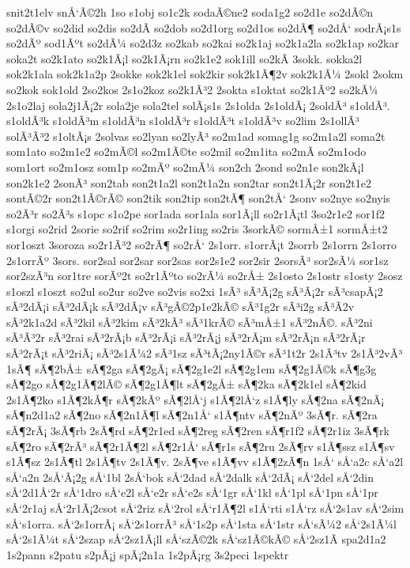 {snit2t1elv
snÅ‘Ã©2h
1so
s1obj
so1c2k
sodaÃ©ne2
soda1g2
so2d1e
so2dÃ©n
so2dÃ©v
so2did
so2dis
so2dÃ­
so2dob
so2d1org
so2d1os
so2dÃ¶
so2dÅ‘
sodrÃ¡s1s
so2dÃº
sod1Ãºt
so2dÃ¼
so2d3z
so2kab
so2kai
so2k1aj
so2k1a2la
so2k1ap
so2kar
soka2t
so2k1ato
so2k1Ã¡l
so2k1Ã¡rn
so2k1e2
sok1ill
so2kÃ­
3sokk.
sokka2l
sok2k1ala
sok2k1a2p
2sokke
sok2k1el
sok2kir
sok2k1Ã¶2v
sok2k1Ã¼
2sokl
2sokm
so2kok
sok1old
2so2kos
2s1o2koz
so2k1Ã³2
2sokta
s1oktat
so2k1Ãº2
so2kÃ¼
2s1o2laj
sola2j1Ã¡2r
sola2je
sola2tel
solÃ¡s1s
2s1olda
2s1oldÃ¡
2soldÃ³
s1oldÃ³.
s1oldÃ³k
s1oldÃ³m
s1oldÃ³n
s1oldÃ³r
s1oldÃ³t
s1oldÃ³v
so2lim
2s1ollÃ³
solÃ³Ã³2
s1oltÃ¡s
2solvas
so2lyan
so2lyÃ³
so2m1ad
somag1g
so2m1a2l
soma2t
som1ato
so2m1e2
so2mÃ©l
so2m1Ã©te
so2mil
so2m1ita
so2mÃ­
so2m1odo
som1ort
so2m1osz
som1p
so2mÃº
so2mÃ¼
son2ch
2sond
so2n1e
son2kÃ¡l
son2k1e2
2sonÃ³
son2tab
son2t1a2l
son2t1a2n
son2tar
son2t1Ã¡2r
son2t1e2
sontÃ©2r
son2t1Ã©rÃ©
son2tik
son2tip
son2tÃ¶
son2tÅ‘
2sonv
so2nye
so2nyis
so2Ã³r
so2Ã³s
s1opc
s1o2pe
sor1ada
sor1ala
sor1Ã¡ll
so2r1Ã¡tl
3so2r1e2
sor1f2
s1orgi
so2rid
2sorie
so2rif
so2rim
so2r1ing
so2ris
3sorkÃ©
sormÅ±1
sormÅ±t2
sor1oszt
3soroza
so2r1Ã³2
so2rÃ¶
so2rÅ‘
2s1orr.
s1orrÃ¡t
2sorrb
2s1orrn
2s1orro
2s1orrÃº
3sors.
sor2sal
sor2sar
sor2sas
sor2s1e2
sor2sir
2sorsÃ³
sor2sÃ¼
sor1sz
sor2szÃ³n
sor1tre
sorÃº2t
so2r1Ãºto
so2rÃ¼
so2rÅ±
2s1osto
2s1ostr
s1osty
2sosz
s1oszl
s1oszt
so2ul
so2ur
so2ve
so2vis
so2xi
1sÃ³
sÃ³Ã¡2g
sÃ³Ã¡2r
sÃ³csapÃ¡2
sÃ³2dÃ¡i
sÃ³2dÃ¡k
sÃ³2dÃ¡v
sÃ³gÃ©2p1e2kÃ©
sÃ³1g2r
sÃ³i2g
sÃ³Ã­2v
sÃ³2k1a2d
sÃ³2kil
sÃ³2kim
sÃ³2kÃ³
sÃ³1krÃ©
sÃ³mÅ±1
sÃ³2nÃ©.
sÃ³2ni
sÃ³Ã³2r
sÃ³2rai
sÃ³2rÃ¡b
sÃ³2rÃ¡i
sÃ³2rÃ¡j
sÃ³2rÃ¡m
sÃ³2rÃ¡n
sÃ³2rÃ¡r
sÃ³2rÃ¡t
sÃ³2riÃ¡
sÃ³2s1Ã¼2
sÃ³1sz
sÃ³tÃ¡2ny1Ã©r
sÃ³1t2r
2s1Ã³tv
2s1Ã³2vÃ³
1sÃ¶
sÃ¶2bÅ±
sÃ¶2ga
sÃ¶2gÃ¡
sÃ¶2g1e2l
sÃ¶2g1em
sÃ¶2g1Ã©k
sÃ¶g3g
sÃ¶2go
sÃ¶2g1Ã¶2lÃ©
sÃ¶2g1Ã¶lt
sÃ¶2gÅ±
sÃ¶2ka
sÃ¶2k1el
sÃ¶2kid
2s1Ã¶2ko
s1Ã¶2kÃ¶r
sÃ¶2kÃº
sÃ¶2lÅ‘j
s1Ã¶2lÅ‘z
s1Ã¶ly
sÃ¶2na
sÃ¶2nÃ¡
sÃ¶n2d1a2
sÃ¶2no
sÃ¶2n1Ã¶l
sÃ¶2n1Å‘
s1Ã¶ntv
sÃ¶2nÃº
3sÃ¶r.
sÃ¶2ra
sÃ¶2rÃ¡
3sÃ¶rb
2sÃ¶rd
sÃ¶2r1ed
sÃ¶2reg
sÃ¶2ren
sÃ¶r1f2
sÃ¶2r1iz
3sÃ¶rk
sÃ¶2ro
sÃ¶2rÃ³
sÃ¶2r1Ã¶2l
sÃ¶2r1Å‘
sÃ¶r1s
sÃ¶2ru
2sÃ¶rv
s1Ã¶ssz
s1Ã¶sv
s1Ã¶sz
2s1Ã¶tl
2s1Ã¶tv
2s1Ã¶v.
2sÃ¶ve
s1Ã¶vv
s1Ã¶2zÃ¶n
1sÅ‘
sÅ‘a2c
sÅ‘a2l
sÅ‘a2n
2sÅ‘Ã¡2g
sÅ‘1bl
2sÅ‘bok
sÅ‘2dad
sÅ‘2dalk
sÅ‘2dÃ¡
sÅ‘2del
sÅ‘2din
sÅ‘2d1Å‘2r
sÅ‘1dro
sÅ‘e2l
sÅ‘e2r
sÅ‘e2s
sÅ‘1gr
sÅ‘1kl
sÅ‘1pl
sÅ‘1pn
sÅ‘1pr
sÅ‘2r1aj
sÅ‘2r1Ã¡2csot
sÅ‘2riz
sÅ‘2rol
sÅ‘r1Ã¶2l
s1Å‘rti
s1Å‘rz
sÅ‘2s1av
sÅ‘2sim
sÅ‘s1orra.
sÅ‘2s1orrÃ¡
sÅ‘2s1orrÃ³
sÅ‘1s2p
sÅ‘1sta
sÅ‘1str
sÅ‘sÃ¼2
sÅ‘2s1Ã¼l
sÅ‘2s1Ã¼t
sÅ‘2szap
sÅ‘2sz1Ã¡ll
sÅ‘szÃ©2k
sÅ‘sz1Ã©kÃ©
sÅ‘2sz1Ã­
spa2d1a2
1s2pann
s2patu
s2pÃ¡j
spÃ¡2n1a
1s2pÃ¡rg
3s2peci
1spektr
}
